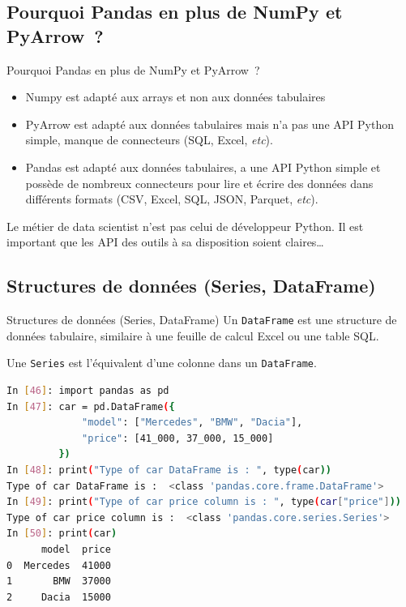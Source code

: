 \documentclass{beamer}
\begin{document}
    \subsection{Pourquoi Pandas en plus de NumPy et PyArrow~?}

    \begin{frame}{Pourquoi Pandas en plus de NumPy et PyArrow~?}
        \begin{itemize}
            \item Numpy est adapté aux arrays et non aux données tabulaires
            \item PyArrow est adapté aux données tabulaires mais n'a pas une API Python simple, manque de connecteurs (SQL, Excel, \textit{etc}).
            \item Pandas est adapté aux données tabulaires, a une API Python simple et possède de nombreux connecteurs pour lire et écrire des données dans différents formats (CSV, Excel, SQL, JSON, Parquet, \textit{etc}).
        \end{itemize}
        \bigbreak
        \begin{dangercolorbox}
            Le métier de data scientist n'est pas celui de développeur Python.
            Il est important que les API des outils à sa disposition soient claires\ldots
        \end{dangercolorbox}
    \end{frame}

    \subsection{Structures de données (Series, DataFrame)}
    \begin{frame}[fragile]{Structures de données (Series, DataFrame)}
        Un \lstinline{DataFrame} est une structure de données tabulaire, similaire à une feuille de calcul Excel ou une table SQL.

        Une \lstinline{Series} est l'équivalent d'une colonne dans un \lstinline{DataFrame}.
        \begin{lstlisting}[language=bash]
In [46]: import pandas as pd
In [47]: car = pd.DataFrame({
             "model": ["Mercedes", "BMW", "Dacia"],
             "price": [41_000, 37_000, 15_000]
         })
In [48]: print("Type of car DataFrame is : ", type(car))
Type of car DataFrame is :  <class 'pandas.core.frame.DataFrame'>
In [49]: print("Type of car price column is : ", type(car["price"]))
Type of car price column is :  <class 'pandas.core.series.Series'>
In [50]: print(car)
      model  price
0  Mercedes  41000
1       BMW  37000
2     Dacia  15000
        \end{lstlisting}
    \end{frame}
\end{document}
